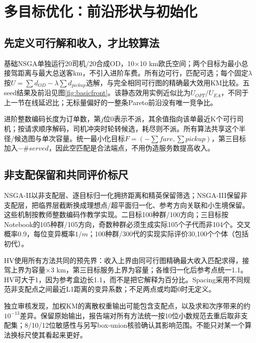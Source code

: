 \section{多目标优化：前沿形状与初始化}
\subsection{先定义可行解和收入，才比较算法}
基础NSGA单独运行20司机/20合成OD，10×10 km欧氏空间；两个目标为最小总接驾距离与最大总送客km，不引入进阶车费。所有边可行，匹配可选；每个固定$\lambda$按$U=\sum d_{OD}-\lambda\sum d_{pickup}$选解，与完全相同可行图的精确最大效用KM比较。五seed结果及前沿见图\ref{fig:basicfront}。该静态效用实例近似比为$U_{OPT}/U_{EA}$，不同于上一节在线延迟比；无标量偏好的一整条Pareto前沿没有唯一竞争比。

进阶整数编码长度为订单数，第$j$位0表示不派，其余值指向该单最近K个可行司机；按请求顺序解码，司机冲突时轮转候选，耗尽则不派。所有算法共享这个半径/候选图与单次容量。统一最小化目标$F=(-\sum fare,\sum pickup)$，第三目标加入$-\#served$，因此空匹配是合法端点，不用伪造服务数提高收入。

\subsection{非支配保留和共同评价标尺}
NSGA-II以非支配层、逐目标归一化拥挤距离和精英保留筛选\cite{nsga2}；NSGA-III保留非支配层，把临界层截断换成理想点/超平面归一化、参考方向关联和小生境保留\cite{nsga3}。这些机制按教师整数编码作教学实现。二目标100种群/100方向；三目标按Notebook的105种群/105方向，奇数种群必须生成实际105个子代而非104个。交叉概率0.9，每位变异概率$1/m$；100种群/300代的实现实际评价30,100个个体（包括初代）。

HV使用所有方法共同的预先界：收入上界由同可行图精确最大收入匹配求得，接驾上界为容量×3 km，第三目标服务上界为容量；各维归一化后参考点统一1.1。HV可大于1，因为参考盒边长1.1，而不是把它解释为百分比。Spacing采用不同规范非支配点之间最近L1距离的变异系数；不足两点或均距0时无定义。

独立审核发现，加权KM的离散权重输出可能包含支配点，以及求和次序带来的约$10^{-13}$差异。保留原始输出，报告端对所有方法统一按10位小数规范去重后取非支配集；8/10/12位敏感性与另写box-union核验确认其影响范围。不能只对某一个算法换标尺使其看起来更好。



